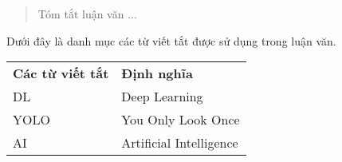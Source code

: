\documentclass[a4paper, oneside]{book}
\begin{document}
\begin{abstract}
	Tóm tắt luận văn ...
\end{abstract}	


\tableofcontents
\listoftables
\listoffigures


\begin{abbreviation}
Dưới đây là danh mục các từ viết tắt được sử dụng trong luận văn.
\begin{table}[!h]
\renewcommand{\arraystretch}{1.3}
\begin{tabular}{p{3cm} p{11cm}}
\textbf{Các từ viết tắt} &  \textbf{Định nghĩa} \\
DL & Deep Learning \\
YOLO & You Only Look Once \\
AI & Artificial Intelligence \\
\end{tabular}
\end{table}
\end{abbreviation}	



\mainmatter


\pagestyle{plain} %






\end{document}
